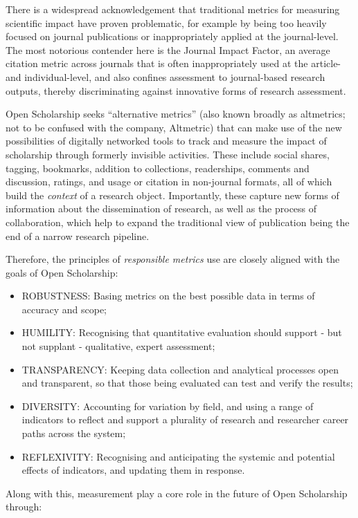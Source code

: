\documentclass[]{article}
\begin{document}
There is a widespread acknowledgement that traditional metrics for
measuring scientific impact have proven problematic, for example by
being too heavily focused on journal publications or inappropriately
applied at the journal-level. The most notorious contender here is the
Journal Impact Factor, an average citation metric across journals that
is often inappropriately used at the article- and individual-level, and
also confines assessment to journal-based research outputs, thereby
discriminating against innovative forms of research assessment.

Open Scholarship seeks ``alternative metrics'' (also known broadly as
altmetrics; not to be confused with the company, Altmetric) that can
make use of the new possibilities of digitally networked tools to track
and measure the impact of scholarship through formerly invisible
activities. These include social shares, tagging, bookmarks, addition to
collections, readerships, comments and discussion, ratings, and usage or
citation in non-journal formats, all of which build the \emph{context}
of a research object. Importantly, these capture new forms of
information about the dissemination of research, as well as the process
of collaboration, which help to expand the traditional view of
publication being the end of a narrow research pipeline.

Therefore, the principles of \emph{responsible metrics} use are closely
aligned with the goals of Open Scholarship:

\begin{itemize}
\item
  ROBUSTNESS: Basing metrics on the best possible data in terms of
  accuracy and scope;
\item
  HUMILITY: Recognising that quantitative evaluation should support -
  but not supplant - qualitative, expert assessment;
\item
  TRANSPARENCY: Keeping data collection and analytical processes open
  and transparent, so that those being evaluated can test and verify the
  results;
\item
  DIVERSITY: Accounting for variation by field, and using a range of
  indicators to reflect and support a plurality of research and
  researcher career paths across the system;
\item
  REFLEXIVITY: Recognising and anticipating the systemic and potential
  effects of indicators, and updating them in response.
\end{itemize}

Along with this, measurement play a core role in the future of Open
Scholarship through:
\end{document}
